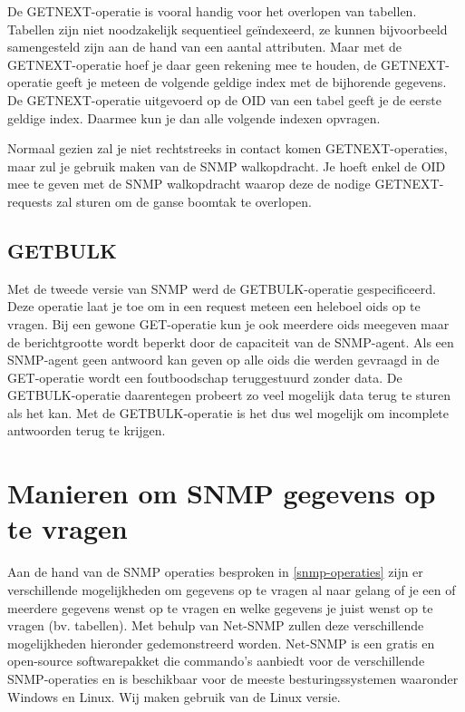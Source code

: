 De GETNEXT-operatie is vooral handig voor het overlopen van tabellen.
Tabellen zijn niet noodzakelijk sequentieel geïndexeerd, ze kunnen bijvoorbeeld samengesteld zijn aan de hand van een aantal attributen.
Maar met de GETNEXT-operatie hoef je daar geen rekening mee te houden, de GETNEXT-operatie geeft je meteen de volgende geldige index met de bijhorende gegevens.
De GETNEXT-operatie uitgevoerd op de OID van een tabel geeft je de eerste geldige index.
Daarmee kun je dan alle volgende indexen opvragen.

Normaal gezien zal je niet rechtstreeks in contact komen GETNEXT-operaties, maar zul je gebruik maken van de SNMP walkopdracht.
Je hoeft enkel de OID mee te geven met de SNMP walkopdracht waarop deze de nodige GETNEXT-requests zal sturen om de ganse boomtak te overlopen.



\subsection{GETBULK}
Met de tweede versie van SNMP werd de GETBULK-operatie gespecificeerd.
Deze operatie laat je toe om in een request meteen een heleboel \glspl{oid} op te vragen.
Bij een gewone GET-operatie kun je ook meerdere \glspl{oid} meegeven maar de berichtgrootte wordt beperkt door de capaciteit van de SNMP-agent.
Als een SNMP-agent geen antwoord kan geven op alle \glspl{oid} die werden gevraagd in de GET-operatie wordt een foutboodschap teruggestuurd zonder data.
De GETBULK-operatie daarentegen probeert zo veel mogelijk data terug te sturen als het kan.
Met de GETBULK-operatie is het dus wel mogelijk om incomplete antwoorden terug te krijgen.\cite{essentialsnmp}

\section{Manieren om SNMP gegevens op te vragen}

Aan de hand van de SNMP operaties besproken in \cref{snmp-operaties} zijn er verschillende mogelijkheden om gegevens op te vragen
al naar gelang of je een of meerdere gegevens wenst op te vragen en welke gegevens je juist wenst op te vragen (bv. tabellen).
Met behulp van Net-SNMP zullen deze verschillende mogelijkheden hieronder gedemonstreerd worden.
Net-SNMP is een gratis en open-source softwarepakket die commando's aanbiedt voor de verschillende SNMP-operaties en
is beschikbaar voor de meeste besturingssystemen waaronder Windows en Linux.
Wij maken gebruik van de Linux versie.


